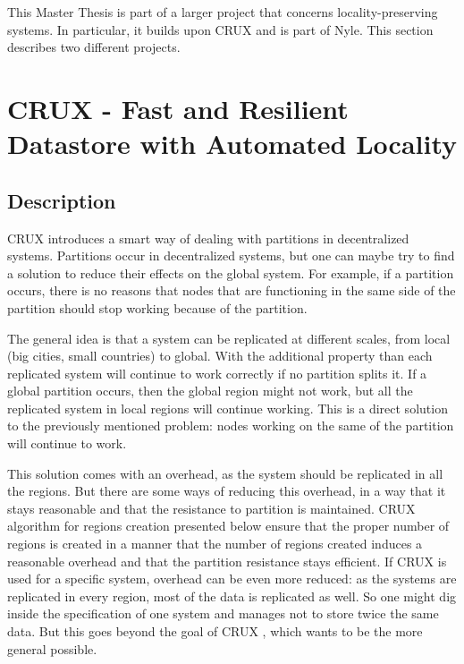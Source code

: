 \documentclass[a4paper,11pt,oneside]{report}
\begin{document}

This Master Thesis is part of a larger project that concerns
locality-preserving systems. In particular, it builds upon
CRUX \cite{Basescu2014} and is part of Nyle. This section describes two
different projects. 

\section{CRUX - Fast and Resilient Datastore with Automated Locality}

\subsection{Description}
CRUX \cite{Basescu2014} introduces a smart way of dealing with partitions in
decentralized systems. Partitions occur in
decentralized systems, but one can maybe try to find a solution to reduce their
effects on the global system. For example, if a partition occurs, there is no
reasons that nodes that are functioning in the same side of the partition should
stop working because of the partition. 

The general idea is that a system can be replicated at different scales, from
local (big cities, small countries) to global. With the additional property than each
replicated system will continue to work correctly if no partition splits it. If
a global partition occurs, then the global region might not work, but all the
replicated system in local regions will continue working. This is a
direct solution to the previously mentioned problem: nodes working on the same
of the partition will continue to work.

This solution comes with an overhead, as the system should be
replicated in all the regions. But there are some ways of reducing this
overhead, in a way that it stays reasonable and that the resistance to
partition is maintained. CRUX algorithm for regions
creation \cite{Basescu2014} presented below ensure that the proper number of
regions is created in a manner that the number of regions created induces a
reasonable overhead and that the partition resistance stays efficient. If CRUX
\cite{Basescu2014} is used for a specific system, overhead can be even more
reduced: as the systems are replicated in every region, most of the data is
replicated as well. So one might dig inside the specification of one
system and manages not to store twice the same data. But this goes beyond
the goal of CRUX \cite{Basescu2014}, which wants to be the more general
possible. 
\end{document}
